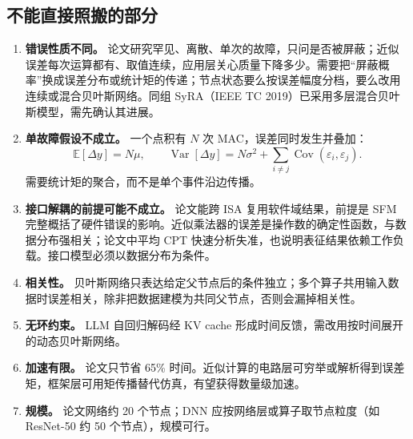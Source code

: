 \documentclass[11pt,a4paper]{ctexart}
\begin{document}
\subsection{不能直接照搬的部分}
\begin{enumerate}[leftmargin=*,label=\textbf{问题 \arabic*.}]
  \item \textbf{错误性质不同。} 论文研究罕见、离散、单次的故障，只问是否被屏蔽；近似误差每次运算都有、取值连续，应用层关心质量下降多少。需要把“屏蔽概率”换成误差分布或统计矩的传递；节点状态要么按误差幅度分档，要么改用连续或混合贝叶斯网络。同组 SyRA（IEEE TC 2019）已采用多层混合贝叶斯模型，需先确认其进展。
  \item \textbf{单故障假设不成立。} 一个点积有 $N$ 次 MAC，误差同时发生并叠加：
  \begin{equation}
  \mathbb{E}[\Delta y] = N\mu,\qquad
  \operatorname{Var}[\Delta y] = N\sigma^2 + \sum_{i\neq j}\operatorname{Cov}(\varepsilon_i,\varepsilon_j).
  \end{equation}
  需要统计矩的聚合，而不是单个事件沿边传播。
  \item \textbf{接口解耦的前提可能不成立。} 论文能跨 ISA 复用软件域结果，前提是 SFM 完整概括了硬件错误的影响。近似乘法器的误差是操作数的确定性函数，与数据分布强相关；论文中平均 CPT 快速分析失准，也说明表征结果依赖工作负载。接口模型必须以数据分布为条件。
  \item \textbf{相关性。} 贝叶斯网络只表达给定父节点后的条件独立；多个算子共用输入数据时误差相关，除非把数据建模为共同父节点，否则会漏掉相关性。
  \item \textbf{无环约束。} LLM 自回归解码经 KV cache 形成时间反馈，需改用按时间展开的动态贝叶斯网络。
  \item \textbf{加速有限。} 论文只节省 65\% 时间。近似计算的电路层可穷举或解析得到误差矩，框架层可用矩传播替代仿真，有望获得数量级加速。
  \item \textbf{规模。} 论文网络约 20 个节点；DNN 应按网络层或算子取节点粒度（如 ResNet-50 约 50 个节点），规模可行。
\end{enumerate}
\end{document}
